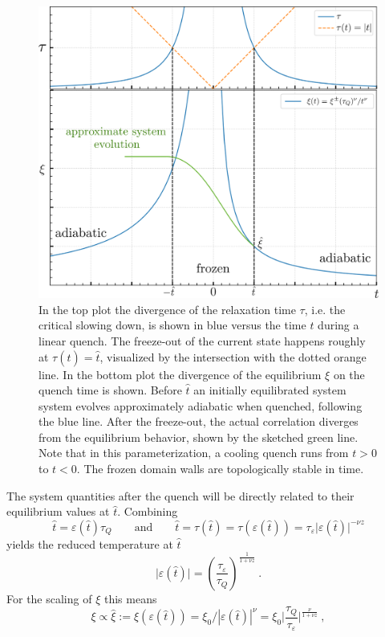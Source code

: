 	\begin{figure}[t!]
		\centering
		\includegraphics[width=0.7\linewidth]{graphics/KZM-divergences.png}
		\caption{In the top plot the divergence of the relaxation time $\tau$, i.e. the critical slowing down, is shown in blue versus the time $t$ during a linear quench. The freeze-out of the current state happens roughly at $\tau(\hat{t}) =	\hat{t}$, visualized by the intersection with the dotted orange line. In the bottom plot the divergence of the equilibrium $\xi$ on the quench time is shown. Before $\hat{t}$ an initially equilibrated system system evolves approximately adiabatic when quenched, following the blue line. After the freeze-out, the actual correlation diverges from the equilibrium behavior, shown by the sketched green line. Note that in this parameterization, a cooling quench runs from $t > 0$ to $t < 0$. The frozen domain walls are topologically stable in time.}
		\label{Fig::Freezeout}
	\end{figure}
	The system quantities after the quench will be directly related to their equilibrium values at $\hat{t}$. Combining
	\begin{equation}
		\hat{t} =	\varepsilon(\hat{t}) \tau_Q \qquad \text{and} \qquad  \hat{t} =	\tau(\hat{t}) = \tau(\varepsilon(\hat{t})) =	\tau_\varepsilon \big | \varepsilon(\hat{t}) \big |^{-\nu z}
	\end{equation}
	yields the reduced temperature at $\hat{t}$
	\begin{equation}
		\big|\varepsilon (\hat{t}) \big| =	\left(\frac{\tau_\varepsilon}{\tau_Q} \right)^{\frac{1}{1 + \nu z}} ~.
	\end{equation}
	For the scaling of $\xi$ this means
	\begin{equation} \label{Eq::KZM-scaling}
		\xi \propto \hat{\xi} := \xi(\varepsilon(\hat{t})) =	\xi_0 / |\varepsilon(\hat{t})|^{\nu} =	\xi_0 \bigg| \frac{\tau_Q}{\tau_\varepsilon} \bigg |^{\frac{\nu}{1 + \nu z}} ~,
	\end{equation}
